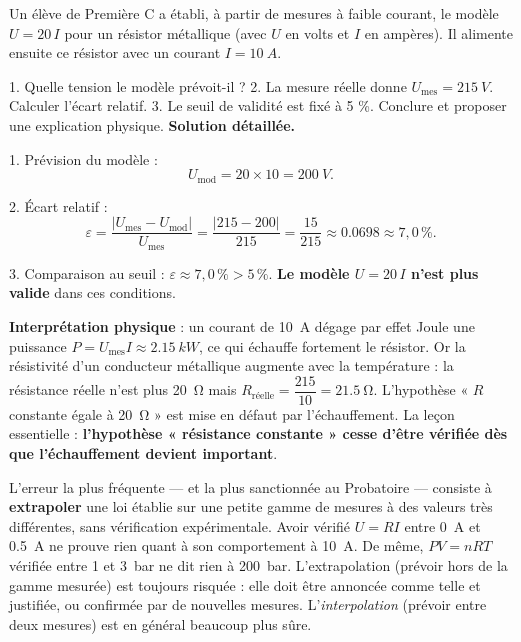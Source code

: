 \documentclass[11pt]{article}
\newcommand{\cle}[1]{{\popxbold\color{popdark}#1}}
\begin{document}
\begin{exoresolu}
Un élève de Première C a établi, à partir de mesures à faible courant, le modèle $U = 20\,I$ pour un résistor métallique (avec $U$ en volts et $I$ en ampères). Il alimente ensuite ce résistor avec un courant $I = \SI{10}{A}$.

1. Quelle tension le modèle prévoit-il ?
2. La mesure réelle donne $U_{\text{mes}} = \SI{215}{V}$. Calculer l'écart relatif.
3. Le seuil de validité est fixé à 5 \%. Conclure et proposer une explication physique.
\tcblower
\textbf{Solution détaillée.}

1. Prévision du modèle :
\[
U_{\text{mod}} = 20 \times 10 = \SI{200}{V}.
\]

2. Écart relatif :
\[
\varepsilon = \frac{|U_{\text{mes}} - U_{\text{mod}}|}{U_{\text{mes}}} = \frac{|215 - 200|}{215} = \frac{15}{215} \approx \num{0,0698} \approx 7,0\,\%.
\]

3. Comparaison au seuil : $\varepsilon \approx 7,0\,\% > 5\,\%$. \textbf{Le modèle $U = 20\,I$ n'est plus valide} dans ces conditions.

\textbf{Interprétation physique} : un courant de \SI{10}{A} dégage par effet Joule une puissance $P = U_{\text{mes}} I \approx \SI{2,15}{kW}$, ce qui échauffe fortement le résistor. Or la résistivité d'un conducteur métallique augmente avec la température : la résistance réelle n'est plus \SI{20}{\ohm} mais $R_{\text{réelle}} = \dfrac{215}{10} = \SI{21,5}{\ohm}$. L'hypothèse « $R$ constante égale à \SI{20}{\ohm} » est mise en défaut par l'échauffement. La leçon essentielle : \textbf{l'hypothèse « résistance constante » cesse d'être vérifiée dès que l'échauffement devient important}.
\end{exoresolu}

\begin{attention}
L'erreur la plus fréquente — et la plus sanctionnée au Probatoire — consiste à \textbf{extrapoler} une loi établie sur une petite gamme de mesures à des valeurs très différentes, sans vérification expérimentale. Avoir vérifié $U = RI$ entre \SI{0}{A} et \SI{0,5}{A} ne prouve rien quant à son comportement à \SI{10}{A}. De même, $PV = nRT$ vérifiée entre 1 et \SI{3}{bar} ne dit rien à \SI{200}{bar}. L'\cle{extrapolation} (prévoir hors de la gamme mesurée) est toujours risquée : elle doit être annoncée comme telle et justifiée, ou confirmée par de nouvelles mesures. L'\emph{interpolation} (prévoir entre deux mesures) est en général beaucoup plus sûre.
\end{attention}
\end{document}
